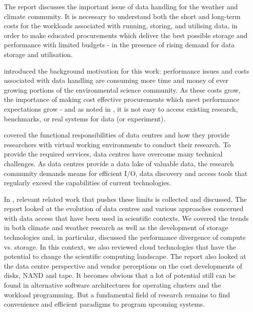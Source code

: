 \documentclass{../../template/esiwace-report}
\begin{document}
The report discusses the important issue of data handling for the weather and climate community.   It is necessary to understand both the short and long-term costs for the workloads associated with running, storing, and utilising data, in order to make educated procurements which deliver the best possible storage and performance with limited budgets - in the presence of rising demand for data storage and utilisation.

 introduced the background motivation for this work: performance issues and costs associated with data handling are consuming more time and money of ever growing portions of the environmental science community. As these costs grow, the importance of making cost effective procurements which meet performance expectations grow - and as noted in , it is not easy to access existing research, benchmarks, or real systems for data (or  experiment).

%

 covered the functional responsibilities of data centres and how they provide researchers with virtual working environments to conduct their research.
To provide the required services, data centres have overcome many technical challenges.
As data centres provide a data lake of valuable data, the research community demands means for efficient I/O, data discovery and access tools that regularly exceed the capabilities of current technologies.


%
In , relevant related work that pushes these limits is collected and discussed.
The report looked at the evolution of data centres and various approaches concerned with data access that have been used in scientific contexts.
We covered the trends in both climate and weather research as well as the development of storage technologies and, in particular, discussed the performance divergence of compute vs. storage.
In this context, we also reviewed cloud technologies that have the potential to change the scientific computing landscape.
The report also looked at the data centre perspective and vendor perceptions on the cost developments of disks, NAND and tape.
It becomes obvious that a lot of potential still can be found in alternative software architectures for operating clusters and the workload programming.
But a fundamental field of research remains to find convenience and efficient paradigms to program upcoming systems.


%
%
%
%
%
%
%
%
\end{document}
